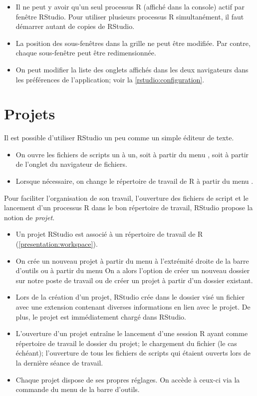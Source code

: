 \begin{itemize}
\item Il ne peut y avoir qu'un seul processus R (affiché dans la
  console) actif par fenêtre RStudio. Pour utiliser plusieurs
  processus R simultanément, il faut démarrer autant de copies de
  RStudio.
\item La position des sous-fenêtres dans la grille ne peut être
  modifiée. Par contre, chaque sous-fenêtre peut être redimensionnée.
\item On peut modifier la liste des onglets affichés dans les deux
  navigateurs dans les préférences de l'application; voir la
  \autoref{rstudio:configuration}.
\end{itemize}


\section{Projets}
\label{rstudio:projets}

Il est possible d'utiliser RStudio un peu comme un simple éditeur de
texte.
\begin{itemize}
\item On ouvre les fichiers de scripts un à un, soit à partir du menu
  , soit à partir de l'onglet  du
  navigateur de fichiers.
\item Lorsque nécessaire, on change le répertoire de travail de R à
  partir du menu .
\end{itemize}

Pour faciliter l'organisation de son travail, l'ouverture des fichiers
de script et le lancement d'un processus R dans le bon répertoire de
travail, RStudio propose la notion de \emph{projet}.
\begin{itemize}
\item Un projet RStudio est associé à un répertoire de travail de R
  (\autoref{presentation:workspace}).
\item On crée un nouveau projet à partir du menu  à
  l'extrémité droite de la barre d'outils ou à partir du menu
   On a alors l'option de créer un nouveau
  dossier sur notre poste de travail ou de créer un projet à partir
  d'un dossier existant.
\item Lors de la création d'un projet, RStudio crée dans le dossier
  visé un fichier avec une extension  contenant diverses
  informations en lien avec le projet. De plus, le projet est
  immédiatement chargé dans RStudio.
\item L'ouverture d'un projet entraîne le lancement d'une session R
  ayant comme répertoire de travail le dossier du projet; le
  chargement du fichier  (le cas échéant); l'ouverture de
  tous les fichiers de scripts qui étaient ouverts lors de la dernière
  séance de travail.
\item Chaque projet dispose de ses propres réglages. On accède à
  ceux-ci via la commande  du menu
   de la barre d'outils.
\end{itemize}


